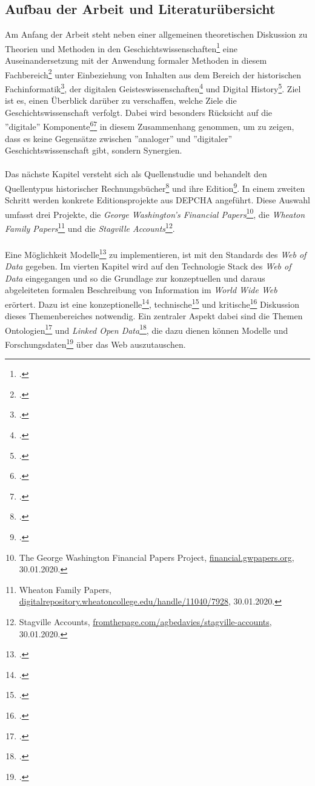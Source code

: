 \documentclass[12pt,a4paper]{article}
\begin{document}
\subsection{Aufbau der Arbeit und Literaturübersicht}
Am Anfang der Arbeit steht neben einer allgemeinen theoretischen Diskussion zu Theorien und Methoden in den Geschichtswissenschaften\footcite{jordan2018theorien} eine Auseinandersetzung mit der Anwendung formaler Methoden in diesem Fachbereich\footcite{thaller2017ungefahre} unter Einbeziehung von Inhalten aus dem Bereich der historischen Fachinformatik\footcite{thaller2017historical}, der digitalen Geisteswissenschaften\footcite{jannidis2017digital} und Digital History\footcite{graham2015exploring}. Ziel ist es, einen Überblick darüber zu verschaffen, welche Ziele die Geschichtswissenschaft verfolgt. Dabei wird besonders Rücksicht auf die ''digitale'' Komponente\footcite{fohr2017historische}\footcite{wintergrun2019netzwerkanalysen} in diesem Zusammenhang genommen, um zu zeigen, dass es keine Gegensätze zwischen ''analoger'' und ''digitaler'' Geschichtswissenschaft gibt, sondern Synergien.
\\
\\
Das nächste Kapitel versteht sich als Quellenstudie und behandelt den Quellentypus historischer Rechnungsbücher\footcite{gleba2015wirtschafts} und ihre Edition\footcite{vogeler2015mittelalterliche}. In einem zweiten Schritt werden konkrete Editionsprojekte aus DEPCHA angeführt. Diese Auswahl umfasst drei Projekte, die \textit{George Washington’s Financial Papers}\footnote{The George Washington Financial Papers Project, \url{financial.gwpapers.org}, 30.01.2020.}, die \textit{Wheaton Family Papers}\footnote{Wheaton Family Papers, \url{digitalrepository.wheatoncollege.edu/handle/11040/7928}, 30.01.2020.} und die \textit{Stagville Accounts}\footnote{Stagville Accounts, \url{fromthepage.com/agbedavies/stagville-accounts}, 30.01.2020.}.
\\
\\
Eine Möglichkeit Modelle\footcite[][]{stachowiak1973allgemeine} zu implementieren, ist mit den Standards des \textit{Web of Data} gegeben. Im vierten Kapitel wird auf den Technologie Stack des \textit{Web of Data} eingegangen und so die Grundlage zur konzeptuellen und daraus abgeleiteten formalen Beschreibung von Information im \textit{World Wide Web} erörtert. Dazu ist eine konzeptionelle\footcite{berners2001semantic}, technische\footcite{bernstein2016new} und kritische\footcite{swartz2013aaron} Diskussion dieses Themenbereiches notwendig. Ein zentraler Aspekt dabei sind die Themen Ontologien\footcite{stuckenschmidt2009ontologien} und \textit{Linked Open Data}\footcite{bauer2011linked}, die dazu dienen können Modelle und Forschungsdaten\footcite{neher2011semantische} über das Web auszutauschen.
\end{document}
